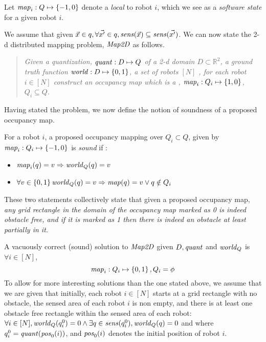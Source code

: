 Let $\mathit{map}_i:Q\mapsto \left\{-1,0\right\}$ denote a \qdfunc \emph{local} to robot $i$, which we see as a \emph{software state} for a given robot $i$.  %



We assume that given $\Vec{x} \in q, \forall \Vec{x^\prime} \in q, \mathit{sens}(\Vec{x}) \subseteq \mathit{sens}(\Vec{x^\prime})$. We can now state the 2-d distributed mapping problem, $\mathit{Map2D}$ as follows. \begin{quote}
{\em Given a quantization, $\mathit{quant}:D\mapsto Q$ of a 2-d domain $D\subset \mathbb{R}^2$, a ground truth function $\mathit{world}:D \mapsto \left\{0,1\right\}$, a set of robots $[N]$ , for each robot $i \in [N]$ construct an \emph{occupancy map} which is a \qdfunc, $\mathit{map}_i: Q_i \mapsto \left\{1,0\right\}$, $Q_i\subseteq Q$.
}
\end{quote}


Having stated the problem, we now define the notion of soundness of a proposed occupancy map.
\begin{definition}
    \label{soundness}
    For a robot $i$, a proposed occupancy mapping over $Q_i\subset Q$, given by $\mathit{map}_i: Q_i \mapsto \left\{-1,0\right\}$ is \emph{sound} if :
    \begin{itemize}
        \item $\mathit{map}_i(q) = v \Rightarrow \mathit{world}_Q(q)  = v$
        \item $\forall v \in \left\{0,1\right\}\mathit{world}_Q(q) = v \Rightarrow \mathit{map}(q) = v \vee q\notin Q_i$
    \end{itemize}
\end{definition}


These two statements collectively state that given a proposed occupancy map, \emph{any grid rectangle in the domain of the occupancy map marked as 0 is indeed obstacle free, and if it is marked as 1 then there is indeed an obstacle at least partially in it.}

A vacuously correct (sound) solution to $\mathit{Map2D}$ given $D, \mathit{quant}$ and $\mathit{world}_Q$ is $\forall i \in [N]$, $$\mathit{map}_i : Q_i \mapsto \left\{0,1\right\}, Q_i = \phi$$ To allow for more interesting solutions than the one stated above, we assume that we are given that initially, each robot $i\in[N]$ starts at a grid rectangle with no obstacle, the sensed area of each robot $i$ is non empty, and there is at least one obstacle free rectangle within the sensed area of each robot:
$\forall i \in [N], \mathit{world}_Q(q^0_i) = 0 \wedge \exists q \in \mathit{sens}(q^0_i), \mathit{world}_Q(q) = 0 $ and
where $q^0_i = \mathit{quant}(\mathit{pos}_0(i))$, and $\mathit{pos}_0(i)$ denotes the initial position of robot $i$.


